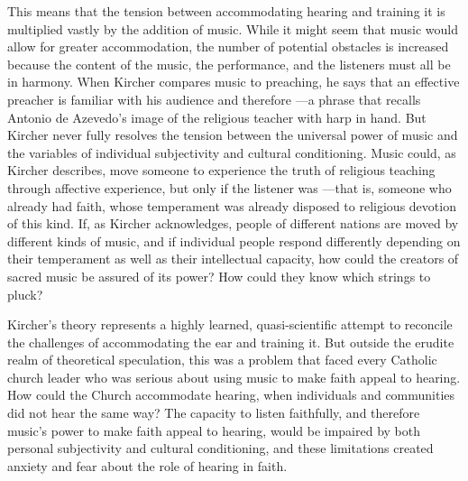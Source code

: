 This means that the tension between accommodating hearing and training it is
multiplied vastly by the addition of music.
While it might seem that music would allow for greater accommodation, the number
of potential obstacles is increased because the content of the music, the
performance, and the listeners must all be in harmony.
When Kircher compares music to preaching, he says that an effective preacher is
familiar with his audience and therefore ---a phrase that recalls Antonio de Azevedo's image of the religious
teacher with harp in hand.%
    \Autocite[551]{Kircher:Musurgia}
But Kircher never fully resolves the tension between the universal power of
music and the variables of individual subjectivity and cultural conditioning.
Music could, as Kircher describes, move someone to experience the truth of
religious teaching through affective experience, but only if the listener was
---that is, someone who already
had faith, whose temperament was already disposed to religious devotion of this
kind.
If, as Kircher acknowledges, people of different nations are moved by different
kinds of music, and if individual people respond differently depending on their
temperament as well as their intellectual capacity, how could the creators of
sacred music be assured of its power?
How could they know which strings to pluck?


Kircher's theory represents a highly learned, quasi-scientific attempt to
reconcile the challenges of accommodating the ear and training it.
But outside the erudite realm of theoretical speculation, this was a problem
that faced every Catholic church leader who was serious about using music to
make faith appeal to hearing.
How could the Church accommodate hearing, when individuals and communities did
not hear the same way?
The capacity to listen faithfully, and therefore music's power to make faith
appeal to hearing, would be impaired by both personal subjectivity and cultural
conditioning, and these limitations created anxiety and fear about the role of
hearing in faith.

